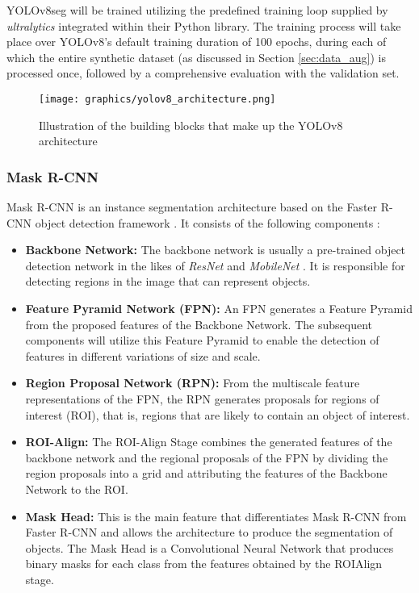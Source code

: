 \documentclass[draft,final]{vutinfth} %
\begin{document}
YOLOv8seg will be trained utilizing the predefined training loop supplied by \textit{ultralytics} integrated within their Python library. The training process will take place over YOLOv8's default training duration of 100 epochs, during each of which the entire synthetic dataset (as discussed in Section \ref{sec:data_aug}) is processed once, followed by a comprehensive evaluation with the validation set. 

\begin{figure}
    \centering
    \texttt{[image: graphics/yolov8\_architecture.png]}
    \caption{Illustration of the building blocks that make up the YOLOv8 architecture \cite{yao_hp-yolov8_2024}}
    \label{fig:yolov8_architecture}
\end{figure}

\subsubsection{Mask R-CNN} \label{sec:method_maskrcnn}
Mask R-CNN is an instance segmentation architecture based on the Faster R-CNN object detection framework \cite{ren_faster_2016}. It consists of the following components \cite{he_mask_2018, potrimba_what_2023}:

\begin{itemize}
    \item \textbf{Backbone Network:} The backbone network is usually a pre-trained object detection network in the likes of \textit{ResNet} \cite{he_deep_2015} and \textit{MobileNet} \cite{howard_mobilenets_2017}. It is responsible for detecting regions in the image that can represent objects.
    \item \textbf{Feature Pyramid Network (FPN):} An FPN generates a Feature Pyramid from the proposed features of the Backbone Network. The subsequent components will utilize this Feature Pyramid to enable the detection of features in different variations of size and scale.
    \item \textbf{Region Proposal Network (RPN):} From the multiscale feature representations of the FPN, the RPN generates proposals for regions of interest (ROI), that is, regions that are likely to contain an object of interest.
    \item \textbf{ROI-Align:} The ROI-Align Stage combines the generated features of the backbone network and the regional proposals of the FPN by dividing the region proposals into a grid and attributing the features of the Backbone Network to the ROI.
    \item \textbf{Mask Head:} This is the main feature that differentiates Mask R-CNN from Faster R-CNN and allows the architecture to produce the segmentation of objects. The Mask Head is a Convolutional Neural Network that produces binary masks for each class from the features obtained by the ROIAlign stage.
\end{itemize}
\end{document}
